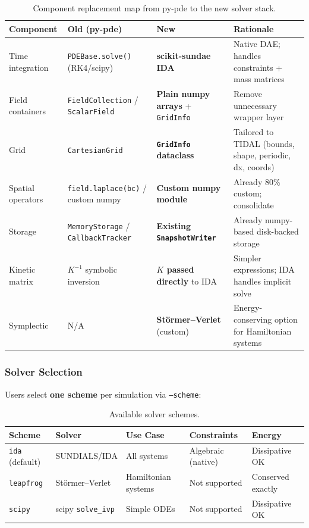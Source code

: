 \begin{table}[htbp]
\centering
\caption{Component replacement map from py-pde to the new solver stack.}
\label{tab:component-replacement}
\begin{tabular}{@{}llll@{}}
\toprule
Component & Old (py-pde) & New & Rationale \\
\midrule
Time integration & \texttt{PDEBase.solve()} (RK4/scipy) & \textbf{scikit-sundae IDA} & Native DAE; handles constraints + mass matrices \\
Field containers & \texttt{FieldCollection} / \texttt{ScalarField} & \textbf{Plain numpy arrays} + \texttt{GridInfo} & Remove unnecessary wrapper layer \\
Grid & \texttt{CartesianGrid} & \textbf{\texttt{GridInfo} dataclass} & Tailored to TIDAL (bounds, shape, periodic, dx, coords) \\
Spatial operators & \texttt{field.laplace(bc)} / custom numpy & \textbf{Custom numpy module} & Already 80\% custom; consolidate \\
Storage & \texttt{MemoryStorage} / \texttt{CallbackTracker} & \textbf{Existing \texttt{SnapshotWriter}} & Already numpy-based disk-backed storage \\
Kinetic matrix & $K^{-1}$ symbolic inversion & \textbf{$K$ passed directly} to IDA & Simpler expressions; IDA handles implicit solve \\
Symplectic & N/A & \textbf{St\"ormer--Verlet} (custom) & Energy-conserving option for Hamiltonian systems \\
\bottomrule
\end{tabular}
\end{table}

\subsubsection{Solver Selection}
\label{sec:solver-selection}

Users select \textbf{one scheme} per simulation via \texttt{--scheme}:

\begin{table}[htbp]
\centering
\caption{Available solver schemes.}
\label{tab:solver-schemes}
\begin{tabular}{@{}lllll@{}}
\toprule
Scheme & Solver & Use Case & Constraints & Energy \\
\midrule
\texttt{ida} (default) & SUNDIALS/IDA & All systems & Algebraic (native) & Dissipative OK \\
\texttt{leapfrog} & St\"ormer--Verlet & Hamiltonian systems & Not supported & Conserved exactly \\
\texttt{scipy} & scipy \texttt{solve\_ivp} & Simple ODEs & Not supported & Dissipative OK \\
\bottomrule
\end{tabular}
\end{table}

